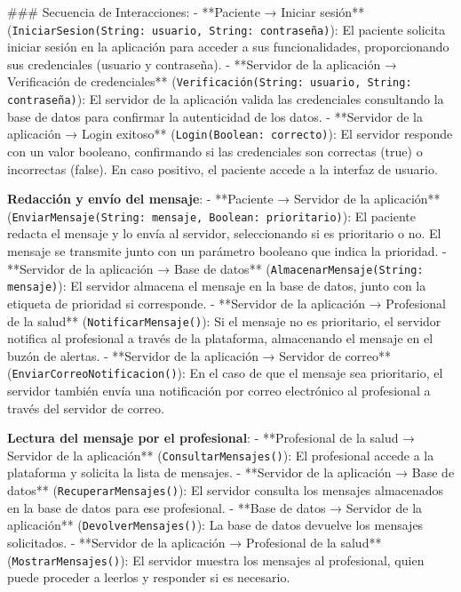 \documentclass{article}
\begin{document}
### Secuencia de Interacciones:
- **Paciente → Iniciar sesión** (\texttt{IniciarSesion(String: usuario, String: contraseña)}): El paciente solicita iniciar sesión en la aplicación para acceder a sus funcionalidades, proporcionando sus credenciales (usuario y contraseña).
- **Servidor de la aplicación → Verificación de credenciales** (\texttt{Verificación(String: usuario, String: contraseña)}): El servidor de la aplicación valida las credenciales consultando la base de datos para confirmar la autenticidad de los datos.
- **Servidor de la aplicación → Login exitoso** (\texttt{Login(Boolean: correcto)}): El servidor responde con un valor booleano, confirmando si las credenciales son correctas (true) o incorrectas (false). En caso positivo, el paciente accede a la interfaz de usuario.

\textbf{Redacción y envío del mensaje}:
- **Paciente → Servidor de la aplicación** (\texttt{EnviarMensaje(String: mensaje, Boolean: prioritario)}): El paciente redacta el mensaje y lo envía al servidor, seleccionando si es prioritario o no. El mensaje se transmite junto con un parámetro booleano que indica la prioridad.
- **Servidor de la aplicación → Base de datos** (\texttt{AlmacenarMensaje(String: mensaje)}): El servidor almacena el mensaje en la base de datos, junto con la etiqueta de prioridad si corresponde.
- **Servidor de la aplicación → Profesional de la salud** (\texttt{NotificarMensaje()}): Si el mensaje no es prioritario, el servidor notifica al profesional a través de la plataforma, almacenando el mensaje en el buzón de alertas.
- **Servidor de la aplicación → Servidor de correo** (\texttt{EnviarCorreoNotificacion()}): En el caso de que el mensaje sea prioritario, el servidor también envía una notificación por correo electrónico al profesional a través del servidor de correo.

\textbf{Lectura del mensaje por el profesional}:
- **Profesional de la salud → Servidor de la aplicación** (\texttt{ConsultarMensajes()}): El profesional accede a la plataforma y solicita la lista de mensajes.
- **Servidor de la aplicación → Base de datos** (\texttt{RecuperarMensajes()}): El servidor consulta los mensajes almacenados en la base de datos para ese profesional.
- **Base de datos → Servidor de la aplicación** (\texttt{DevolverMensajes()}): La base de datos devuelve los mensajes solicitados.
- **Servidor de la aplicación → Profesional de la salud** (\texttt{MostrarMensajes()}): El servidor muestra los mensajes al profesional, quien puede proceder a leerlos y responder si es necesario.
\end{document}
